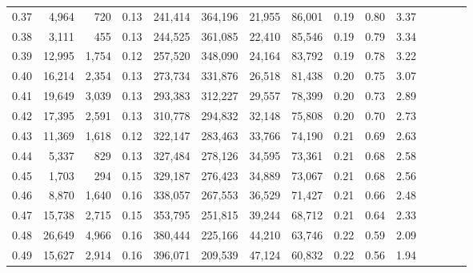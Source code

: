 \begin{tabular}{rrrcrrrrrrrrrrr}
0.37 &   4,964 &    720 &                                       0.13 &  241,414 &  364,196 &   21,955 &   86,001 &  0.19 &  0.80 &                         3.37 \\
0.38 &   3,111 &    455 &                                       0.13 &  244,525 &  361,085 &   22,410 &   85,546 &  0.19 &  0.79 &                         3.34 \\
0.39 &  12,995 &  1,754 &                                       0.12 &  257,520 &  348,090 &   24,164 &   83,792 &  0.19 &  0.78 &                         3.22 \\
0.40 &  16,214 &  2,354 &                                       0.13 &  273,734 &  331,876 &   26,518 &   81,438 &  0.20 &  0.75 &                         3.07 \\
0.41 &  19,649 &  3,039 &                                       0.13 &  293,383 &  312,227 &   29,557 &   78,399 &  0.20 &  0.73 &                         2.89 \\
0.42 &  17,395 &  2,591 &                                       0.13 &  310,778 &  294,832 &   32,148 &   75,808 &  0.20 &  0.70 &                         2.73 \\
0.43 &  11,369 &  1,618 &                                       0.12 &  322,147 &  283,463 &   33,766 &   74,190 &  0.21 &  0.69 &                         2.63 \\
0.44 &   5,337 &    829 &                                       0.13 &  327,484 &  278,126 &   34,595 &   73,361 &  0.21 &  0.68 &                         2.58 \\
0.45 &   1,703 &    294 &                                       0.15 &  329,187 &  276,423 &   34,889 &   73,067 &  0.21 &  0.68 &                         2.56 \\
0.46 &   8,870 &  1,640 &                                       0.16 &  338,057 &  267,553 &   36,529 &   71,427 &  0.21 &  0.66 &                         2.48 \\
0.47 &  15,738 &  2,715 &                                       0.15 &  353,795 &  251,815 &   39,244 &   68,712 &  0.21 &  0.64 &                         2.33 \\
0.48 &  26,649 &  4,966 &                                       0.16 &  380,444 &  225,166 &   44,210 &   63,746 &  0.22 &  0.59 &                         2.09 \\
0.49 &  15,627 &  2,914 &                                       0.16 &  396,071 &  209,539 &   47,124 &   60,832 &  0.22 &  0.56 &                         1.94 \\

\end{tabular}
